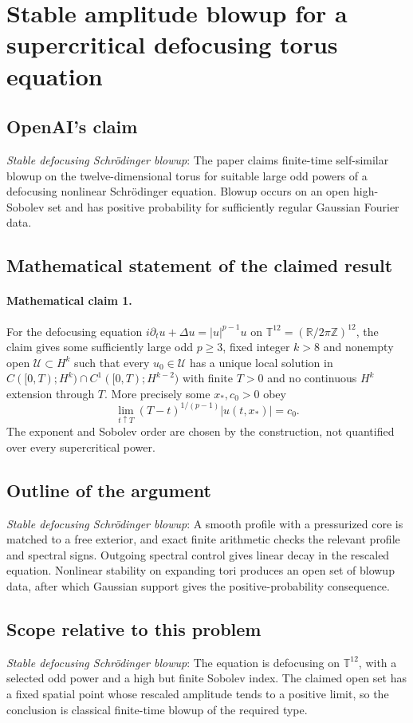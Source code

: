 \documentclass[11pt]{article}
\begin{document}
\section*{Stable amplitude blowup for a supercritical defocusing torus equation}

\subsection{OpenAI's claim}
\textit{Stable defocusing Schrödinger blowup}: The paper claims finite-time self-similar blowup on the twelve-dimensional torus for suitable large odd powers of a defocusing nonlinear Schrödinger equation. Blowup occurs on an open high-Sobolev set and has positive probability for sufficiently regular Gaussian Fourier data.

\subsection{Mathematical statement of the claimed result}
\paragraph{Mathematical claim 1.} For the defocusing equation $i\partial_tu+\Delta u=|u|^{p-1}u$ on $\mathbb T^{12}=(\mathbb R/2\pi\mathbb Z)^{12}$, the claim gives some sufficiently large odd $p\ge3$, fixed integer $k>8$ and nonempty open $\mathcal U\subset H^k$ such that every $u_0\in\mathcal U$ has a unique local solution in $C([0,T);H^k)\cap C^1([0,T);H^{k-2})$ with finite $T>0$ and no continuous $H^k$ extension through $T$. More precisely some $x_*,c_0>0$ obey \[\lim_{t\uparrow T}(T-t)^{1/(p-1)}|u(t,x_*)|=c_0.\] The exponent and Sobolev order are chosen by the construction, not quantified over every supercritical power.

\subsection{Outline of the argument}
\textit{Stable defocusing Schrödinger blowup}: A smooth profile with a pressurized core is matched to a free exterior, and exact finite arithmetic checks the relevant profile and spectral signs. Outgoing spectral control gives linear decay in the rescaled equation. Nonlinear stability on expanding tori produces an open set of blowup data, after which Gaussian support gives the positive-probability consequence.

\subsection{Scope relative to this problem}
\textit{Stable defocusing Schrödinger blowup}: The equation is defocusing on $\mathbb T^{12}$, with a selected odd power and a high but finite Sobolev index. The claimed open set has a fixed spatial point whose rescaled amplitude tends to a positive limit, so the conclusion is classical finite-time blowup of the required type.
\end{document}
